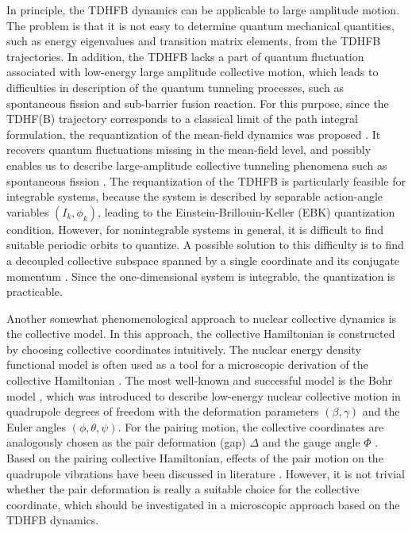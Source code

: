 \documentclass[%
superscriptaddress,
preprint,
showpacs,
nofootinbib,
amsmath,amssymb,
aps,
prc,
floatfix ]%
{revtex4-1}
\begin{document}
In principle, the TDHFB dynamics can be applicable to large amplitude motion.
The problem is that it is not easy to determine quantum mechanical 
quantities, such as energy eigenvalues and transition matrix elements,
from the TDHFB trajectories.
In addition, the TDHFB lacks a part of quantum fluctuation
associated with low-energy
large amplitude collective motion,
which leads to difficulties in description of the quantum tunneling
processes, such as spontaneous fission and sub-barrier fusion reaction.
For this purpose,
since the TDHF(B) trajectory corresponds to a classical limit of the path
integral formulation,
the requantization of the mean-field dynamics was
proposed \cite{Neg82,KS80,K81,Rei80}.
It recovers quantum fluctuations missing in the mean-field
level, and possibly enables us to describe large-amplitude collective
tunneling phenomena such as spontaneous fission \cite{Neg82}.
The requantization of the TDHFB is particularly feasible
for integrable systems, because the system is described by separable
action-angle variables $(I_k, \phi_k)$, leading to
the Einstein-Brillouin-Keller (EBK) quantization condition.
However, for nonintegrable systems in general, it is difficult to find
suitable periodic orbits to quantize.
A possible solution to this difficulty is to find a decoupled collective
subspace spanned by
a single coordinate and its conjugate momentum \cite{NMMY16}.
Since the one-dimensional system is integrable, the quantization is
practicable.

Another somewhat phenomenological approach
to nuclear collective dynamics is the collective model.
In this approach, the collective Hamiltonian is constructed by choosing
collective coordinates intuitively.
The nuclear energy density functional model is often used as a tool for
a microscopic derivation of the collective Hamiltonian \cite{NMMY16}.
The most well-known and successful model is the Bohr model \cite{BM75},
which was introduced to describe low-energy
nuclear collective motion in quadrupole degrees of freedom with
the deformation parameters $(\beta, \gamma)$ and the Euler angles
$(\phi,\theta,\psi)$.
For the pairing motion, the collective coordinates are analogously
chosen as the pair deformation (gap) $\Delta$ and the gauge angle $\Phi$
\cite{BBPK70}.
Based on the pairing collective Hamiltonian, 
effects of the pair motion on the quadrupole vibrations %
have been discussed in literature \cite{delta1,delta3}.
However, it is not trivial whether the pair deformation is really a suitable
choice for the collective coordinate,
which should be investigated in a microscopic approach based on
the TDHFB dynamics.
\end{document}
